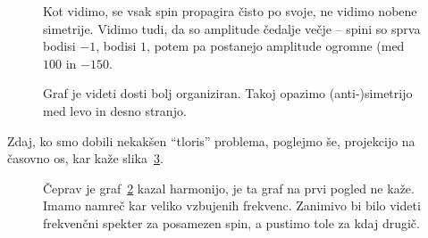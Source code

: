 \documentclass[12pt, a4 paper]{article}
\begin{document}
\begin{figure}[H]\centering
	
	\vspace{-32pt}
	\caption{Kot vidimo, se vsak spin propagira \v cisto po svoje, ne vidimo nobene simetrije. Vidimo tudi, da so
		amplitude \v cedalje ve\v cje -- spini so sprva bodisi $-1$, bodisi $1$, potem pa postanejo amplitude
		ogromne (med $100$ in $-150$.}
	\label{fail}
\end{figure}

\begin{figure}[H]\centering
	
	\vspace{-32pt}
	\caption{Graf je videti dosti bolj organiziran. Takoj opazimo (anti-)simetrijo med levo in desno stranjo.}
	\label{bravo}
\end{figure}

Zdaj, ko smo dobili nekak\v sen "`tloris"' problema, poglejmo \v se, projekcijo na \v casovno os, kar ka\v ze
slika~\ref{spini}.

\begin{figure}[H]\centering
	
	\caption{\v Ceprav je graf~\ref{bravo} kazal harmonijo, je ta graf na prvi pogled ne ka\v ze. Imamo namre\v c
		kar veliko vzbujenih frekvenc. Zanimivo bi bilo videti frekven\v cni spekter za posamezen spin, a
		pustimo tole za kdaj drugi\v c.}
	\label{spini}
\end{figure}
\end{document}
